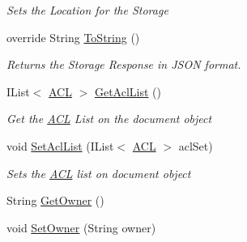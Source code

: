 \begin{DoxyCompactItemize}
\begin{DoxyCompactList}\small\item\em Sets the Location for the Storage \end{DoxyCompactList}\item 
override String \hyperlink{classcom_1_1shephertz_1_1app42_1_1paas_1_1sdk_1_1windows_1_1_meta_response_1_1_j_s_o_n_document_a8654551724e8d58eeb89af35b4a0b5a9}{To\+String} ()
\begin{DoxyCompactList}\small\item\em Returns the Storage Response in J\+S\+O\+N format. \end{DoxyCompactList}\item 
I\+List$<$ \hyperlink{classcom_1_1shephertz_1_1app42_1_1paas_1_1sdk_1_1windows_1_1_a_c_l}{A\+C\+L} $>$ \hyperlink{classcom_1_1shephertz_1_1app42_1_1paas_1_1sdk_1_1windows_1_1_meta_response_1_1_j_s_o_n_document_adcbd4390459816738001523152edb733}{Get\+Acl\+List} ()
\begin{DoxyCompactList}\small\item\em Get the \hyperlink{classcom_1_1shephertz_1_1app42_1_1paas_1_1sdk_1_1windows_1_1_a_c_l}{A\+C\+L} List on the document object \end{DoxyCompactList}\item 
void \hyperlink{classcom_1_1shephertz_1_1app42_1_1paas_1_1sdk_1_1windows_1_1_meta_response_1_1_j_s_o_n_document_a8f7bd41f7a3c3d2b19eb5cf58e3c7c07}{Set\+Acl\+List} (I\+List$<$ \hyperlink{classcom_1_1shephertz_1_1app42_1_1paas_1_1sdk_1_1windows_1_1_a_c_l}{A\+C\+L} $>$ acl\+Set)
\begin{DoxyCompactList}\small\item\em Sets the \hyperlink{classcom_1_1shephertz_1_1app42_1_1paas_1_1sdk_1_1windows_1_1_a_c_l}{A\+C\+L} list on document object \end{DoxyCompactList}\item 
String \hyperlink{classcom_1_1shephertz_1_1app42_1_1paas_1_1sdk_1_1windows_1_1_meta_response_1_1_j_s_o_n_document_a5249c82ee95f634a65f36722ca5aa83f}{Get\+Owner} ()
\item 
void \hyperlink{classcom_1_1shephertz_1_1app42_1_1paas_1_1sdk_1_1windows_1_1_meta_response_1_1_j_s_o_n_document_ade3ea356679ba30b4916e736d709d18c}{Set\+Owner} (String owner)
\end{DoxyCompactItemize}
